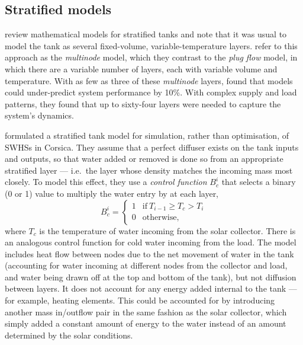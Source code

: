 \subsection{Stratified models}
\label{sec:review:stratified-tank-models}

\textcite{Hollands89} review mathematical models for stratified tanks and note that it was usual to model the tank as several fixed-volume, variable-temperature layers.
\textcite{Kleinbach93} refer to this approach as the \emph{multinode} model, which they contrast to the \emph{plug flow} model, in which there are a variable number of layers, each with variable volume and temperature.
With as few as three of these \emph{multinode} layers,  found that models could under-predict system performance by 10\%.
With complex supply and load patterns, they found that up to sixty-four layers were needed to capture the system's dynamics.

\textcite{Cristofari02} formulated a stratified tank model for simulation, rather than optimisation, of SWHSs in Corsica.
They assume that a perfect diffuser exists on the tank inputs and outputs, so that water added or removed is done so from an appropriate stratified layer --- i.e.\ the layer whose density matches the incoming mass most closely.
To model this effect, they use a \emph{control function} $B_c^i$ that selects a binary (0 or 1) value to multiply the water entry by at each layer,
$$ B_c^i = \left\{ \begin{array}{ll}
   1 & \text{if}\ T_{i-1} \geq T_c > T_i \\
   0 & \text{otherwise},
\end{array} \right. $$
where $T_c$ is the temperature of water incoming from the solar collector.
There is an analogous control function for cold water incoming from the load.
The model includes heat flow between nodes due to the net movement of water in the tank (accounting for water incoming at different nodes from the collector and load, and water being drawn off at the top and bottom of the tank), but not diffusion between layers.
It does not account for any energy added internal to the tank --- for example, heating elements.
This could be accounted for by introducing another mass in/outflow pair in the same fashion as the solar collector, which simply added a constant amount of energy to the water instead of an amount determined by the solar conditions.

